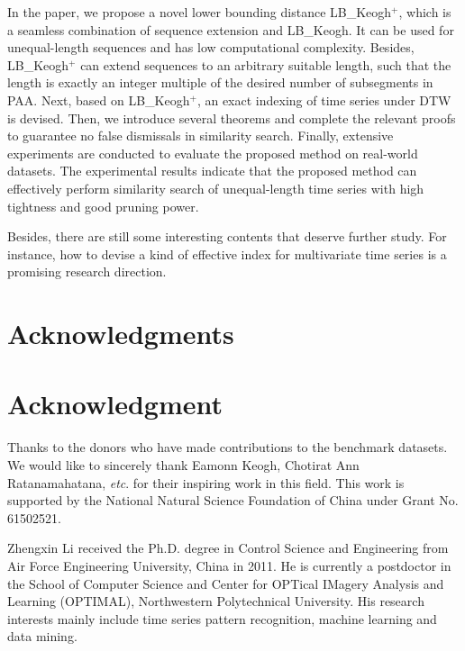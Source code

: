 \documentclass[10pt,journal,compsoc]{IEEEtran}
\begin{document}
In the paper, we propose a novel lower bounding distance LB\_Keogh$^+$,
which is a seamless combination of sequence extension and LB\_Keogh.
It can be used for unequal-length sequences and has low computational complexity.
Besides, LB\_Keogh$^+$ can extend sequences to an arbitrary suitable length,
such that the length is exactly an integer multiple of the desired number of subsegments in PAA.
Next, based on LB\_Keogh$^+$, an exact indexing of time series under DTW is devised.
Then, we introduce several theorems and complete the relevant proofs
to guarantee no false dismissals in similarity search.
Finally, extensive experiments are conducted to evaluate the proposed method on real-world datasets.
The experimental results indicate that
the proposed method can effectively perform similarity search of unequal-length time series
with high tightness and good pruning power.

Besides, there are still some interesting contents that deserve further study.
For instance, how to devise a kind of effective index for multivariate time series
is a promising research direction.




















\ifCLASSOPTIONcompsoc
\section*{Acknowledgments}
\else
\section*{Acknowledgment}
\fi


Thanks to the donors who have made contributions to the benchmark datasets.
We would like to sincerely thank Eamonn Keogh, Chotirat Ann Ratanamahatana, \emph{etc}. for their inspiring work in this field.
This work is supported by the National Natural Science Foundation of China under Grant No. 61502521.

\ifCLASSOPTIONcaptionsoff
  \newpage
\fi













\begin{IEEEbiography}{Zhengxin Li}
received the Ph.D. degree in Control Science and Engineering from Air Force Engineering University, China in 2011.
He is currently a postdoctor in the School of Computer Science
and Center for OPTical IMagery Analysis and Learning (OPTIMAL),
Northwestern Polytechnical University.
His research interests mainly include time series pattern recognition, machine learning and data mining.
\end{IEEEbiography}
\end{document}
